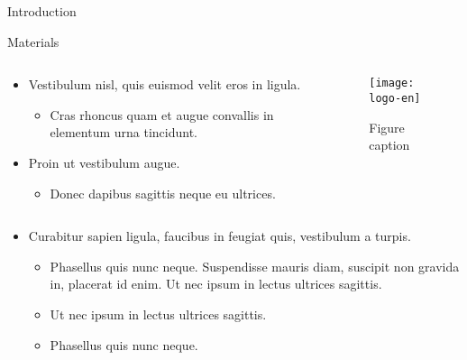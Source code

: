 \documentclass[final,hyperref={pdfpagelabels=false}]{beamer}
\begin{document}
\begin{frame}[t]
\begin{columns}[t]
\begin{column}{.465\textwidth}
\begin{block}{Introduction}
\end{block}


\begin{block}{Materials}

\begin{columns} %
\begin{column}{.54\textwidth} %
\begin{itemize}
\item Vestibulum nisl, quis euismod velit eros in ligula.
\begin{itemize}
\item Cras rhoncus quam et augue convallis in elementum urna tincidunt.
\end{itemize}
\item Proin ut vestibulum augue.
\begin{itemize}
\item Donec dapibus sagittis neque eu ultrices.
\end{itemize}
\end{itemize}
\end{column}

\begin{column}{.43\textwidth} %
\centering
\begin{figure}
\texttt{[image: logo-en]}
\caption{Figure caption}
\end{figure}
\end{column}
\end{columns} %

\begin{itemize}
\item Curabitur sapien ligula, faucibus in feugiat quis, vestibulum a turpis.
\begin{itemize}
\item Phasellus quis nunc neque. Suspendisse mauris diam, suscipit non gravida in, placerat id enim. Ut nec ipsum in lectus ultrices sagittis.
\item Ut nec ipsum in lectus ultrices sagittis.
\item Phasellus quis nunc neque.
\end{itemize}
\end{itemize}


\end{block}
\end{column}
\end{columns}
\end{frame}
\end{document}
